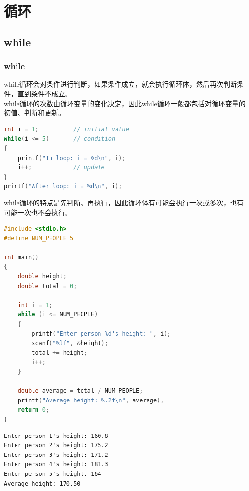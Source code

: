\chapter{循环}

\section{while}

\subsection{while}

while循环会对条件进行判断，如果条件成立，就会执行循环体，然后再次判断条件，直到条件不成立。\\

while循环的次数由循环变量的变化决定，因此while循环一般都包括对循环变量的初值、判断和更新。

\vspace{-0.5cm}

\begin{lstlisting}[language=C]
int i = 1;          // initial value
while(i <= 5)       // condition
{
    printf("In loop: i = %d\n", i);
    i++;            // update
}
printf("After loop: i = %d\n", i);
\end{lstlisting}

while循环的特点是先判断、再执行，因此循环体有可能会执行一次或多次，也有可能一次也不会执行。\\


\begin{lstlisting}[language=C]
#include <stdio.h>
#define NUM_PEOPLE 5

int main()
{
    double height;
    double total = 0;

    int i = 1;
    while (i <= NUM_PEOPLE)
    {
        printf("Enter person %d's height: ", i);
        scanf("%lf", &height);
        total += height;
        i++;
    }

    double average = total / NUM_PEOPLE;
    printf("Average height: %.2f\n", average);
    return 0;
}
\end{lstlisting}

\begin{tcolorbox}
    \begin{verbatim}
Enter person 1's height: 160.8
Enter person 2's height: 175.2
Enter person 3's height: 171.2
Enter person 4's height: 181.3
Enter person 5's height: 164
Average height: 170.50
\end{verbatim}
\end{tcolorbox}

